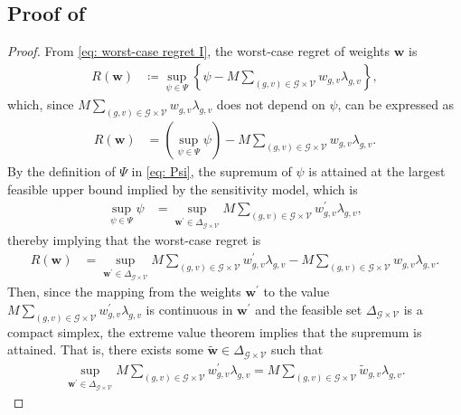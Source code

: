 \documentclass[twoside,11pt]{article}
\begin{document}
\subsection*{Proof of }

\begin{proof}

From \eqref{eq: worst-case regret I}, the worst-case regret of weights $\bm{w}$ is
\begin{align*}
R(\bm{w}) & \coloneqq \sup_{\psi\in\Psi} \left\{\psi - M \sum_{(g,v) \in \mathcal{G} \times \mathcal{V}} w_{g,v} \lambda_{g,v} \right\},
\end{align*}
which, since $M \sum_{(g,v) \in \mathcal{G} \times \mathcal{V}} w_{g,v} \lambda_{g,v}$ does not depend on $\psi$, can be expressed as 
\begin{align*}
R(\bm{w}) & = \left(\sup_{\psi\in\Psi} \psi\right) - M \sum_{(g,v) \in \mathcal{G} \times \mathcal{V}} w_{g,v} \lambda_{g,v}.
\end{align*}
By the definition of $\Psi$ in \eqref{eq: Psi}, the supremum of $\psi$ is attained at the largest feasible upper bound implied by the sensitivity model, which is
\begin{align*}
\sup_{\psi\in\Psi} \psi & = \sup_{\bm{w}^{\prime} \in \Delta_{\mathcal{G} \times \mathcal{V}}} M \sum_{(g,v) \in \mathcal{G} \times \mathcal{V}} w^{\prime}_{g,v} \lambda_{g,v},
\end{align*}
thereby implying that the worst-case regret is 
\begin{align} \label{eq: worst-case regret II}
R(\bm{w}) & = \sup_{\bm{w}^{\prime} \in \Delta_{\mathcal{G} \times \mathcal{V}}} M \sum_{(g,v) \in \mathcal{G} \times \mathcal{V}} w^{\prime}_{g,v} \lambda_{g,v} - M \sum_{(g,v) \in \mathcal{G} \times \mathcal{V}} w_{g,v} \lambda_{g,v}.
\end{align}
Then, since the mapping from the weights $\bm{w}^{\prime}$ to the value 
$M \sum_{(g,v) \in \mathcal{G} \times \mathcal{V}} w^{\prime}_{g,v} \lambda_{g,v}$
is continuous in $\bm{w}^{\prime}$ and the feasible set $\Delta_{\mathcal{G} \times \mathcal{V}}$ is a compact simplex, the extreme value theorem implies that the supremum is attained. That is, there exists some $\bm{\tilde{w}} \in \Delta_{\mathcal{G} \times \mathcal{V}}$ such that
\begin{align*}
\sup_{\bm{w}^{\prime} \in \Delta_{\mathcal{G} \times \mathcal{V}}} 
M \sum_{(g,v) \in \mathcal{G} \times \mathcal{V}} w^{\prime}_{g,v}\lambda_{g,v}
=
M \sum_{(g,v) \in \mathcal{G} \times \mathcal{V}} \tilde{w}_{g,v} \lambda_{g,v}.

\end{align*}
\end{proof}
\end{document}
